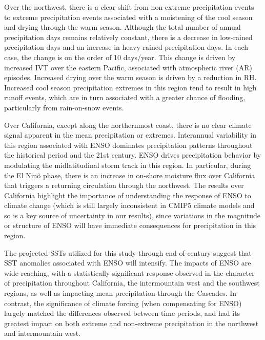 Over the northwest, there is a clear shift from non-extreme precipitation events to extreme precipitation events associated with a moistening of the cool season and drying through the warm season.  Although the total number of annual precipitation days remains relatively constant, there is a decrease in low-rained precipitation days and an increase in heavy-rained precipitation days.  In each case, the change is on the order of 10 days/year.  This change is driven by increased IVT over the eastern Pacific, associated with atmospheric river (AR) episodes. Increased drying over the warm season is driven by a reduction in RH.  Increased cool season precipitation extremes in this region tend to result in high runoff events, which are in turn associated with a greater chance of flooding, particularly from rain-on-snow events.

Over California, except along the northernmost coast, there is no clear climate signal apparent in the mean precipitation or extremes. Interannual variability in this region associated with ENSO dominates precipitation patterns throughout the historical period and the 21st century. ENSO drives precipitation behavior by modulating the midlatitudinal storm track in this region.  In particular, during the El Nin\~o phase, there is an increase in on-shore moisture flux over California that triggers a returning circulation through the northwest.  The results over California highlight the importance of understanding the response of ENSO to climate change (which is still largely inconsistent in CMIP5 climate models and so is a key source of uncertainty in our results), since variations in the magnitude or structure of ENSO will have immediate consequences for precipitation in this region.

The projected SSTs utilized for this study through end-of-century suggest that SST anomalies associated with ENSO will intensify. The impacts of ENSO are wide-reaching, with a statistically significant response observed in the character of precipitation throughout California, the intermountain west and the southwest regions, as well as impacting mean precipitation through the Cascades.  In contrast, the significance of climate forcing (when compensating for ENSO) largely matched the differences observed between time periods, and had its greatest impact on both extreme and non-extreme precipitation in the northwest and intermountain west.


%

